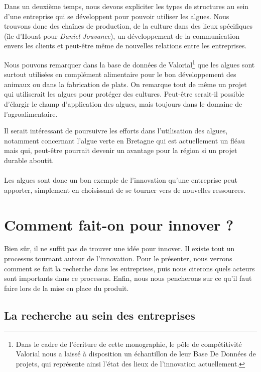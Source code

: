 \documentclass[a4paper,12pt]{report}
\begin{document}
			Dans un deuxième temps, nous devons expliciter les types de structures au sein d’une entreprise qui se développent pour pouvoir utiliser les algues. Nous trouvons donc des chaînes de production, de la culture dans des lieux spécifiques (île d’Houat pour \textit{Daniel Jouvance})\cite{Algues}, un développement de la communication envers les clients et peut-être même de nouvelles relations entre les entreprises.
			
			Nous pouvons remarquer dans la base de données de Valorial\footnote{Dans le cadre de l'écriture de cette monographie, le pôle de compétitivité Valorial nous a laissé à disposition un échantillon de leur Base De Données de projets, qui représente ainsi l'état des lieux de l'innovation actuellement.} que les algues sont surtout utilisées en complément alimentaire pour le bon développement des animaux ou dans la fabrication de plats. On remarque tout de même un projet qui utiliserait les algues pour protéger des cultures. Peut-être serait-il possible d’élargir le champ d’application des algues, mais toujours dans le domaine de l’agroalimentaire. 
			
			Il serait intéressant de poursuivre les efforts dans l’utilisation des algues, notamment concernant l’algue verte en Bretagne qui est actuellement un fléau mais qui, peut-être pourrait devenir un avantage pour la région si un projet durable aboutit. 
			
		\paragraph{}Les algues sont donc un bon exemple de l'innovation qu'une entreprise peut apporter, simplement en choisissant de se tourner vers de nouvelles ressources.
			
	\section{Comment fait-on pour innover ?}
		Bien sûr, il ne suffit pas de trouver une idée pour innover. Il existe tout un processus tournant autour de l'innovation. Pour le présenter, nous verrons comment se fait la recherche dans les entreprises, puis nous citerons quels acteurs sont importants dans ce processus. Enfin, nous nous pencherons sur ce qu'il faut faire lors de la mise en place du produit.
			
		\subsection{La recherche au sein des entreprises}
\end{document}

